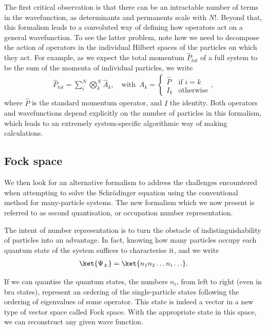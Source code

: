 The first critical observation is that there can be an intractable number of terms in the wavefunction, as determinants and permanents scale with $N!$. Beyond that, this formalism leads to a convoluted way of defining how operators act on a general wavefunction. To see the latter problem, note how we need to decompose the action of operators in the individual Hilbert spaces of the particles on which they act. For example, as we expect the total momentum $\hat{P}_{tot}$ of a full system to be the sum of the momenta of individual particles, we write
\begin{align}
\hat{P}_{tot}=\sum_i^N \bigotimes_k^N \hat{A}_k, \quad \text{with}\enspace A_k=\begin{cases}
\hat{P} & \text{if } i = k \\
I_k & \text{otherwise}
\end{cases},    \label{eq:tot_mom}
\end{align}
where $\hat{P}$ is the standard momentum operator, and $I$ the identity. Both operators and wavefunctions depend explicitly on the number of particles in this formalism, which leads to an extremely system-specific algorithmic way of making calculations.

\subsection{Fock space}

We then look for an alternative formalism to address the challenges encountered when attempting to solve the Schrödinger equation using the conventional method for many-particle systems. The new formalism which we now present is referred to as second quantisation, or occupation number representation.

The intent of number representation is to turn the obstacle of indistinguishability of particles into an advantage. In fact, knowing how many particles occupy each quantum state of the system suffices to characterise it, and we write
\begin{align}
    \ket{\Psi_{\pm}} = \ket{n_1n_2 \ldots n_i \ldots }.
    \label{eq:fock_state}
\end{align}

If we can quantise the quantum states, the numbers $n_i$, from left to right (even in bra states), represent an ordering of the single-particle states following the ordering of eigenvalues of some operator. This state is indeed a vector in a new type of vector space called Fock space. With the appropriate state in this space, we can reconstruct any given wave function.

